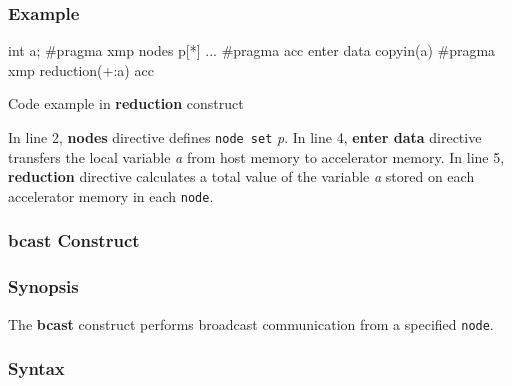 \subsubsection*{Example}
\begin{myfigure}
\begin{minipage}{0.45\hsize}
\begin{center}
\end{center}
\end{minipage}
%
\begin{minipage}{0.53\hsize}
\begin{center}
\begin{XACCCexampleR}
int a;
#pragma xmp nodes p[*]
...
#pragma acc enter data copyin(a)
#pragma xmp reduction(+:a) acc
\end{XACCCexampleR}
\end{center}
\end{minipage}
\caption{Code example in {\XACC} {\bf reduction} construct}\label{code:reduction}
\end{myfigure}

In line 2,
{\XMP} {\bf nodes} directive defines {\tt node set} {\it p}.
In line 4,
{\OACC} {\bf enter data} directive transfers the local variable {\it a} from host memory to accelerator memory.
In line 5,
{\XACC} {\bf reduction} directive calculates a total value of the variable {\it a} stored on each accelerator
memory in each {\tt node}.

\subsubsection{bcast Construct}\label{sec:bcast}
\subsubsection*{Synopsis}
The {\bf bcast} construct performs broadcast communication from a specified {\tt node}.

\subsubsection*{Syntax}

